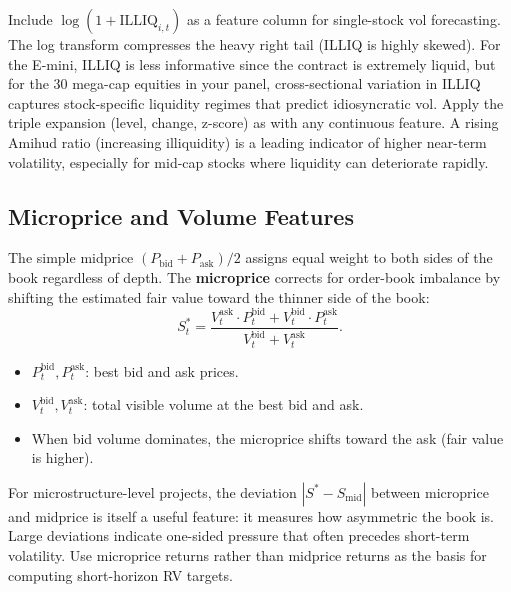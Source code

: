 \begin{projectconnection}
Include $\log(1 + \text{ILLIQ}_{i,t})$ as a feature column for single-stock vol forecasting.
The log transform compresses the heavy right tail (ILLIQ is highly skewed).
For the E-mini, ILLIQ is less informative since the contract is extremely liquid, but for the 30 mega-cap equities in your panel, cross-sectional variation in ILLIQ captures stock-specific liquidity regimes that predict idiosyncratic vol.
Apply the triple expansion (level, change, z-score) as with any continuous feature.
A rising Amihud ratio (increasing illiquidity) is a leading indicator of higher near-term volatility, especially for mid-cap stocks where liquidity can deteriorate rapidly.
\end{projectconnection}

\subsection{Microprice and Volume Features}\label{sec:feat-microprice}

The simple midprice $(P_{\text{bid}} + P_{\text{ask}})/2$ assigns equal weight to both sides of the book regardless of depth.
The \textbf{microprice} \citep{CarteaJaimungalPenalva2015} corrects for order-book imbalance by shifting the estimated fair value toward the thinner side of the book:
\begin{equation}\label{eq:microprice}
  S^*_t = \frac{V_t^{\text{ask}} \cdot P_t^{\text{bid}} + V_t^{\text{bid}} \cdot P_t^{\text{ask}}}{V_t^{\text{bid}} + V_t^{\text{ask}}}.
\end{equation}
\begin{itemize}[nosep]
  \item $P_t^{\text{bid}}, P_t^{\text{ask}}$: best bid and ask prices.
  \item $V_t^{\text{bid}}, V_t^{\text{ask}}$: total visible volume at the best bid and ask.
  \item When bid volume dominates, the microprice shifts toward the ask (fair value is higher).
\end{itemize}

\begin{projectconnection}
For microstructure-level projects, the deviation $|S^* - S_{\text{mid}}|$ between microprice and midprice is itself a useful feature: it measures how asymmetric the book is. Large deviations indicate one-sided pressure that often precedes short-term volatility. Use microprice returns rather than midprice returns as the basis for computing short-horizon RV targets.
\end{projectconnection}


